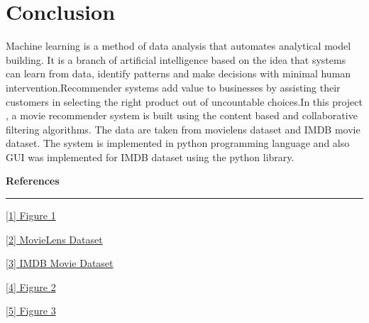 \documentclass[onecolumn]{article}
\begin{document}
\section{\textbf{Conclusion}}
\vspace{2mm}
\hspace{0.5cm}Machine learning is a method of data analysis that automates analytical model building. It is a branch of artificial intelligence based on the idea that systems can learn from data, identify patterns and make decisions with minimal human intervention.Recommender systems add value to businesses by assisting their customers in selecting the right product out of uncountable choices.In this project , a movie recommender system is built using the content based and collaborative filtering  algorithms. The data are taken from movielens dataset and IMDB movie dataset. The system is implemented in python programming language and also GUI was implemented for IMDB dataset using the python library.



\vspace{20mm}
\Large\textbf{References}\normalsize{}

\rule{140mm}{0.3mm}

\href{https://www.sciencedirect.com/science/article/pii/S1110866515000341}{[1] Figure 1}
\vspace{5mm}

\href{http://files.grouplens.org/datasets/movielens/ml-latest-small.zip}{[2] MovieLens Dataset}
\vspace{5mm}

\href{https://data.world/promptcloud/imdb-data-from-2006-to-2016}{[3] IMDB Movie Dataset}
\vspace{5mm}

\href{https://towardsdatascience.com/brief-on-recommender-systems-b86a1068a4dd}{[4] Figure 2}
\vspace{5mm}

\href{https://ars.els-cdn.com/content/image/1-s2.0-S1110866515000341-gr3.jpg}{[5] Figure 3}
\vspace{5mm}


\nocite{*}


\end{document}

